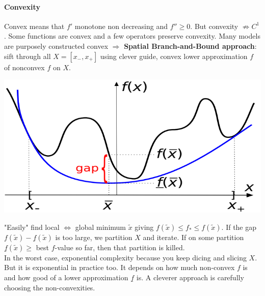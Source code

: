 \documentclass[10pt]{report}
\begin{document}
\paragraph{Convexity} Convex means that $f'$ monotone non decreasing and $f'' \geq 0$. But convexity $\not\Rightarrow C^1$. Some functions are convex and a few operators preserve convexity. Many models are purposely constructed convex $\Rightarrow$  \textbf{Spatial Branch-and-Bound approach}: sift through all $X = [x_-, x_+]$ using clever guide, convex lower approximation \underline{$f$} of nonconvex $f$ on $X$.
\begin{center}
	\includegraphics[scale=0.5]{2.png}
\end{center}
"Easily" find local $\Leftrightarrow$ global minimum $\tilde{x}$ giving \underline{$f$}$(\tilde{x}) \leq f_* \leq f(\tilde{x})$. If the gap $f(\tilde{x}) - \underline{f}(\tilde{x})$ is too large, we partition $X$ and iterate. If on some partition $\underline{f}(\tilde{x}) \geq$ best $f$-value so far, then that partition is killed.\\
In the worst case, exponential complexity because you keep dicing and slicing $X$. But it is exponential in practice too. It depends on how much non-convex $f$ is and how good of a lower approximation $\underline{f}$ is. A cleverer approach is carefully choosing the non-convexities.
\end{document}
